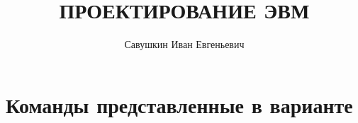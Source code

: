 \newcommand{\resdir}{res}							%

\newcommand{\docauthor}{Савушкин Иван Евгеньевич}
\newcommand{\docauthorseconf}{Таравков Владислав Алексеевич}
\newcommand{\docauthorshort}{Савушкин\,И.\,Е.}
\newcommand{\docauthormail}{savushkin@niuitmo.ru}
\newcommand{\doctitle}{ПРОЕКТИРОВАНИЕ ЭВМ}
\newcommand{\docsupervisor}{Цопа\,Е.\,А.}
\newcommand{\coursename}{Организация ЭВМ и систем}
\newcommand{\worktype}{Курсовая работа}

\title{\doctitle}
\author{\docauthor}







\chapter{Команды представленные в варианте}


